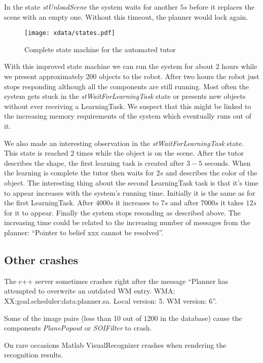 \documentclass{article}
\begin{document}
In the state {\em stUnloadScene} the system waits for another $5s$ before it
replaces the scene with an empty one. Without this timeout, the planner would
lock again.

\begin{figure}
\texttt{[image: xdata/states.pdf]}
\label{fig:allStates}
\caption{Complete state machine for the automated tutor}
\end{figure}

With this improved state machine we can run the system for about 2 hours while
we present approximately 200 objects to the robot. After two hours the robot
just stops responding although all the components are still running. Most often
the system gets stuck in the {\em stWaitForLearningTask} state or presents new
objects without ever receiving a LearningTask.  We suspect that this might be
linked to the increasing memory requirements of the system which eventually
runs out of it.

We also made an interesting observation in the {\em stWaitForLearningTask}
state. This state is reached $2$ times while the object is on the scene. After
the tutor describes the shape, the first learning task is created after $3-5$
seconds. When the learning is complete the tutor then waits for $2s$ and
describes the color of the object.  The interesting thing about the second
LearningTask task is that it's time to appear increases with the system's
running time. Initially it is the same as for the first LearningTask. After
$4000s$ it increases to $7s$ and after $7000s$ it takes $12s$ for it to appear.
Finally the system stops resonding as described above.  The increasing time
could be related to the increasing number of messages from the planner:
``Pointer to belief xxx cannot be resolved''.

\subsection{Other crashes}

The c++ server sometimes crashes right after the message ``Planner has
attempted to overwrite an outdated WM entry. WMA:
XX:goal.scheduler:data:planner.sa.  Local version: 5.  WM version: 6''.

Some of the image pairs (less than 10 out of $1200$ in the database) cause the
components {\em PlanePopout} or {\em SOIFilter} to crash.

On rare occasions Matlab VisualRecognizer crashes when rendering the
recognition results.
\end{document}
